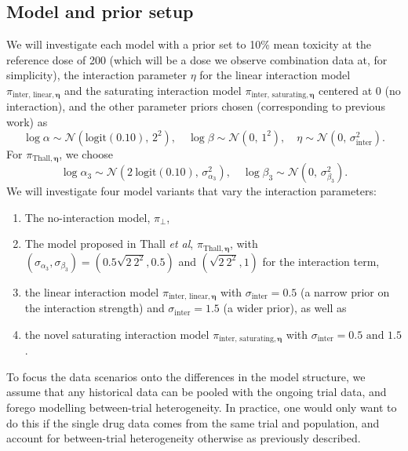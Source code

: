 \documentclass[AMA,STIX1COL]{WileyNJD-v2}
\begin{document}
\subsection{Model and prior setup}
We will investigate each model with a prior set to 10\% mean toxicity at the reference dose of 200 (which will be a dose we observe combination data at, for simplicity), the interaction parameter $\eta$ for the linear interaction model  $\pi_{\text{inter, linear}, \bm{\eta}}$ and the saturating interaction model $\pi_{\text{inter, saturating}, \bm{\eta}}$ centered at 0 (no interaction), and the other parameter priors chosen (corresponding to previous work\cite{Neuenschwander2014}) as
\begin{equation}
\log \alpha \sim \mathcal{N}\left(\text{logit}(0.10),\,2^{2}\right), \quad
\log \beta \sim \mathcal{N}\left(0,\,1^2\right), \quad
\eta \sim \mathcal{N}\left(0,\,\sigma_\text{inter}^2\right).
\end{equation} 
For $\pi_{\text{Thall}, \bm{\eta}}$, we choose
\begin{equation}
\log \alpha_3 \sim \mathcal{N}\left(2~\text{logit}(0.10),\,\sigma_{\alpha_3}^2\right), \quad
\log \beta_3 \sim \mathcal{N}\left(0,\,\sigma_{\beta_3}^2\right).
\end{equation} 
We will investigate four model variants that vary the interaction parameters:
\begin{enumerate}
\item The no-interaction model, $\pi_{\perp}$,
\item The model proposed in Thall \emph{et al}\cite{Thall2003}, $\pi_{\text{Thall}, \bm{\eta}}$, with $\left(\sigma_{\alpha_3}, \sigma_{\beta_3}\right) = \left(0.5 \sqrt{2~2^2}, 0.5\right) $ and $\left(\sqrt{2~2^2}, 1\right)$ for the interaction term,
\item the linear interaction model\cite{Neuenschwander2014}  $\pi_{\text{inter, linear}, \bm{\eta}}$ with $\sigma_\text{inter} = 0.5$ (a narrow prior on the interaction strength) and $\sigma_\text{inter} = 1.5$ (a wider prior), as well as
\item the novel saturating interaction model $\pi_{\text{inter, saturating}, \bm{\eta}}$ with $\sigma_\text{inter} = 0.5\text{ and }1.5$.
\end{enumerate}
To focus the data scenarios onto the differences in the model structure, we assume that any historical data can be pooled with the ongoing trial data, and forego modelling between-trial heterogeneity. In practice, one would only want to do this if the single drug data comes from the same trial and population, and account for between-trial heterogeneity otherwise as previously described\cite{Neuenschwander2016}.
\end{document}
